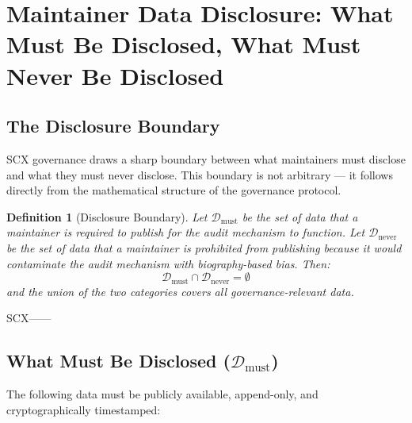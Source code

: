 \documentclass[12pt,a4paper]{article}
\newtheorem{definition}[theorem]{Definition}
\theoremstyle{remark}
\begin{document}
\section{}
\section{Maintainer Data Disclosure: What Must Be Disclosed, What Must Never Be Disclosed}

\subsection{The Disclosure Boundary}

SCX governance draws a sharp boundary between what maintainers must disclose
and what they must never disclose. This boundary is not arbitrary — it follows
directly from the mathematical structure of the governance protocol.

\begin{definition}[Disclosure Boundary]
Let $\mathcal{D}_{\text{must}}$ be the set of data that a maintainer is required
to publish for the audit mechanism to function. Let $\mathcal{D}_{\text{never}}$
be the set of data that a maintainer is prohibited from publishing because it
would contaminate the audit mechanism with biography-based bias. Then:
\begin{equation}
    \mathcal{D}_{\text{must}} \cap \mathcal{D}_{\text{never}} = \emptyset
\end{equation}
and the union of the two categories covers all governance-relevant data.
\end{definition}

\noindent\textbf{}
SCX——


\subsection{What Must Be Disclosed ($\mathcal{D}_{\text{must}}$)}

The following data must be publicly available, append-only, and cryptographically
timestamped:
\end{document}
